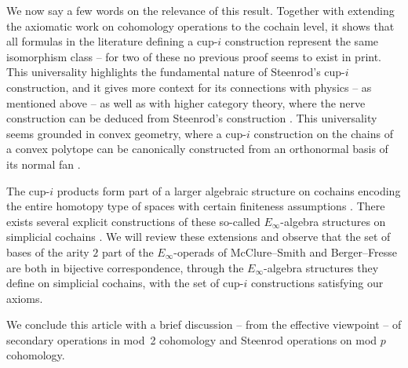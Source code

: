 We now say a few words on the relevance of this result.
Together with extending the axiomatic work on cohomology operations \cite{serre1053eilenberg_maclane, cartan1955iteration, steenrod1962cohomology} to the cochain level, it shows that all formulas in the literature \cite{steenrod1947products, real1996computability,mcclure2003multivariable,berger2004combinatorial,medina2020prop1,medina2023fast_sq} defining a cup-$i$ construction represent the same isomorphism class -- for two of these no previous proof seems to exist in print.
This universality highlights the fundamental nature of Steenrod's \mbox{cup-$i$} construction, and it gives more context for its connections with physics -- as mentioned above -- as well as with higher category theory, where the nerve construction can be deduced from Steenrod's construction \cite{street1987orientals, medina2020globular}.
This universality seems grounded in convex geometry, where a cup-$i$ construction on the chains of a convex polytope can be canonically constructed from an orthonormal basis of its normal fan \cite{medina2022fib_poly}.

The cup-$i$ products form part of a larger algebraic structure on cochains encoding the entire homotopy type of spaces with certain finiteness assumptions \cite{mandell2006homotopy_type}.
There exists several explicit constructions of these so-called $E_\infty$-algebra structures on simplicial cochains \cite{mcclure2003multivariable,berger2004combinatorial,medina2020prop1}.
We will review these extensions and observe that the set of bases of the arity $2$ part of the $E_\infty$-operads of McClure--Smith and Berger--Fresse are both in bijective correspondence, through the $E_\infty$-algebra structures they define on simplicial cochains, with the set of cup-$i$ constructions satisfying our axioms.

We conclude this article with a brief discussion -- from the effective viewpoint -- of secondary operations in mod~2 cohomology and Steenrod operations on mod $p$ cohomology.

